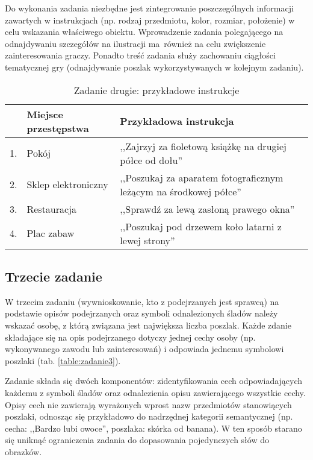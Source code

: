     Do wykonania zadania niezbędne jest zintegrowanie poszczególnych informacji zawartych w instrukcjach (np. rodzaj przedmiotu, kolor, rozmiar, położenie) w celu wskazania właściwego obiektu.
    Wprowadzenie zadania polegającego na odnajdywaniu szczegółów na ilustracji ma~również na celu zwiększenie zainteresowania graczy.
    Ponadto treść zadania służy zachowaniu ciągłości tematycznej gry (odnajdywanie poszlak wykorzystywanych w kolejnym zadaniu).
    
    \begin{table}[H]
        \caption{Zadanie drugie: przykładowe instrukcje}
        \label{table:zadanie2}
        \begin{tabularx}{\textwidth}{ l l X }
         \hline
        
         \hline
          & \textbf{Miejsce przestępstwa} & \textbf{Przykładowa instrukcja} \\
          \hline
         1. & Pokój & ,,Zajrzyj za fioletową książkę na drugiej półce od dołu'' \\
         2. & Sklep elektroniczny & ,,Poszukaj za aparatem fotograficznym leżącym na środkowej półce'' \\
         3. & Restauracja & ,,Sprawdź za lewą zasłoną prawego okna'' \\
         4. & Plac zabaw & ,,Poszukaj pod drzewem koło latarni z lewej strony'' \\
         \hline
         
         \hline
        \end{tabularx}
    \end{table}
    
    \subsection{Trzecie zadanie}
    W trzecim zadaniu (wywnioskowanie, kto z podejrzanych jest sprawcą) na podstawie opisów podejrzanych oraz symboli odnalezionych śladów należy wskazać osobę, z którą związana jest największa liczba poszlak.
    Każde zdanie składające się na opis podejrzanego dotyczy jednej cechy osoby (np. wykonywanego zawodu lub zainteresowań) i odpowiada jednemu symbolowi poszlaki (tab. \ref{table:zadanie3}).
    
    Zadanie składa się dwóch komponentów: zidentyfikowania cech odpowiadających każdemu z symboli śladów oraz odnalezienia opisu zawierającego wszystkie cechy.
    Opisy cech nie zawierają wyrażonych wprost nazw przedmiotów stanowiących poszlaki, odnosząc się przykładowo do nadrzędnej kategorii semantycznej (np. cecha: ,,Bardzo lubi owoce'', poszlaka: skórka od banana).
    W ten sposób starano się uniknąć ograniczenia zadania do dopasowania pojedynczych słów do obrazków.
    

